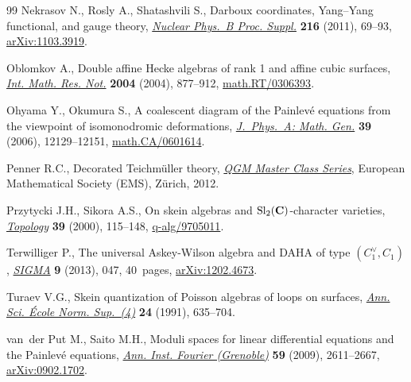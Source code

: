 \documentclass[10pt,a4paper]{amsart}
\numberwithin{equation}{section}
\begin{document}
\begin{thebibliography}{99}
Nekrasov N., Rosly A., Shatashvili S., Darboux coordinates, {Y}ang--{Y}ang
 functional, and gauge theory, \href{https://doi.org/10.1016/j.nuclphysbps.2011.04.150}{\textit{Nuclear Phys.~B Proc. Suppl.}}
 \textbf{216} (2011), 69--93, \href{https://arxiv.org/abs/1103.3919}{arXiv:1103.3919}.

Oblomkov A., Double affine {H}ecke algebras of rank 1 and affine cubic
 surfaces, \href{https://doi.org/10.1155/S1073792804133072}{\textit{Int. Math. Res. Not.}} \textbf{2004} (2004), 877--912,
 \href{https://arxiv.org/abs/math.RT/0306393}{math.RT/0306393}.

Ohyama Y., Okumura S., A coalescent diagram of the {P}ainlev\'{e} equations
 from the viewpoint of iso\-mo\-nodromic deformations, \href{https://doi.org/10.1088/0305-4470/39/39/S08}{\textit{J.~Phys.~A: Math.
 Gen.}} \textbf{39} (2006), 12129--12151, \href{https://arxiv.org/abs/math.CA/0601614}{math.CA/0601614}.

Penner R.C., Decorated {T}eichm\"{u}ller theory, \href{https://doi.org/10.4171/075}{\textit{QGM Master Class Series}},
 European Mathematical Society (EMS), Z\"{u}rich, 2012.

Przytycki J.H., Sikora A.S., On skein algebras and {${\rm Sl}_2({\bf
 C})$}-character varieties, \href{https://doi.org/10.1016/S0040-9383(98)00062-7}{\textit{Topology}} \textbf{39} (2000), 115--148,
 \href{https://arxiv.org/abs/q-alg/9705011}{q-alg/9705011}.

Terwilliger P., The universal {A}skey-{W}ilson algebra and {DAHA} of type
 {$(C^\vee_1,C_1)$}, \href{https://doi.org/10.3842/SIGMA.2013.047}{\textit{SIGMA}} \textbf{9} (2013), 047, 40~pages,
 \href{https://arxiv.org/abs/1202.4673}{arXiv:1202.4673}.

Turaev V.G., Skein quantization of {P}oisson algebras of loops on surfaces,
 \href{https://doi.org/10.24033/asens.1639}{\textit{Ann. Sci. \'{E}cole Norm. Sup.~(4)}} \textbf{24} (1991), 635--704.

van~der Put M., Saito M.H., Moduli spaces for linear differential equations and
 the {P}ainlev\'{e} equations, \href{https://doi.org/10.5802/aif.2502}{\textit{Ann. Inst. Fourier (Grenoble)}}
 \textbf{59} (2009), 2611--2667, \href{https://arxiv.org/abs/0902.1702}{arXiv:0902.1702}.

\end{thebibliography}
\end{document}
